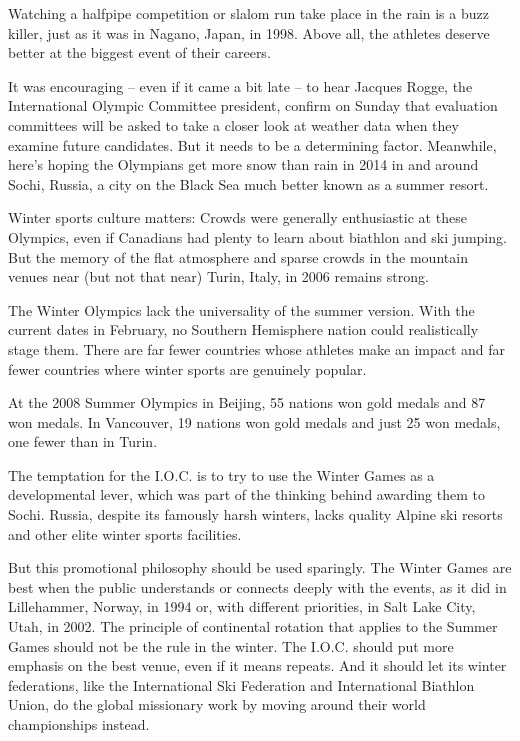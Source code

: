 ﻿\documentclass[12pt]{article}
\begin{document}
Watching a halfpipe competition or slalom run take place in the rain is a buzz killer, just as it
was in Nagano, Japan, in 1998. Above all, the athletes deserve better at the biggest event of their
careers.

It was encouraging -- even if it came a bit late -- to hear Jacques Rogge, the International Olympic
Committee president, confirm on Sunday that evaluation committees will be asked to take a closer
look at weather data when they examine future candidates. But it needs to be a determining factor.
Meanwhile, here's hoping the Olympians get more snow than rain in 2014 in and around Sochi, Russia,
a city on the Black Sea much better known as a summer resort.

Winter sports culture matters: Crowds were generally enthusiastic at these Olympics, even if
Canadians had plenty to learn about biathlon and ski jumping. But the memory of the flat atmosphere
and sparse crowds in the mountain venues near (but not that near) Turin, Italy, in 2006 remains
strong.

The Winter Olympics lack the universality of the summer version. With the current dates in February,
no Southern Hemisphere nation could realistically stage them. There are far fewer countries whose
athletes make an impact and far fewer countries where winter sports are genuinely popular.

At the 2008 Summer Olympics in Beijing, 55 nations won gold medals and 87 won medals. In Vancouver,
19 nations won gold medals and just 25 won medals, one fewer than in Turin.

The temptation for the I.O.C. is to try to use the Winter Games as a developmental lever, which was
part of the thinking behind awarding them to Sochi. Russia, despite its famously harsh winters,
lacks quality Alpine ski resorts and other elite winter sports facilities.

But this promotional philosophy should be used sparingly. The Winter Games are best when the public
understands or connects deeply with the events, as it did in Lillehammer, Norway, in 1994 or, with
different priorities, in Salt Lake City, Utah, in 2002. The principle of continental rotation that
applies to the Summer Games should not be the rule in the winter. The I.O.C. should put more
emphasis on the best venue, even if it means repeats. And it should let its winter federations, like
the International Ski Federation and International Biathlon Union, do the global missionary work by
moving around their world championships instead.
\end{document}
